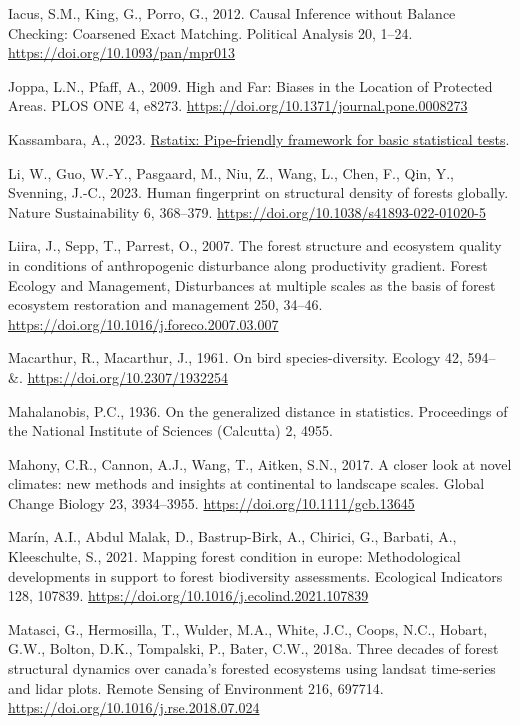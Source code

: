 \documentclass[
]{agujournal2019}
\newlength{\cslhangindent}
\newenvironment{CSLReferences}[2] %
 {\begin{list}{}{%
  \setlength{\itemindent}{0pt}
  \setlength{\leftmargin}{0pt}
  \setlength{\parsep}{0pt}
  \ifodd #1
   \setlength{\leftmargin}{\cslhangindent}
   \setlength{\itemindent}{-1\cslhangindent}
  \fi
  \setlength{\itemsep}{#2\baselineskip}}}
 {\end{list}}
\begin{document}
\begin{CSLReferences}{1}{0}
Iacus, S.M., King, G., Porro, G., 2012. Causal Inference without Balance
Checking: Coarsened Exact Matching. Political Analysis 20, 1--24.
\url{https://doi.org/10.1093/pan/mpr013}

Joppa, L.N., Pfaff, A., 2009. High and Far: Biases in the Location of
Protected Areas. PLOS ONE 4, e8273.
\url{https://doi.org/10.1371/journal.pone.0008273}

Kassambara, A., 2023.
\href{https://rpkgs.datanovia.com/rstatix/}{Rstatix: Pipe-friendly
framework for basic statistical tests}.

Li, W., Guo, W.-Y., Pasgaard, M., Niu, Z., Wang, L., Chen, F., Qin, Y.,
Svenning, J.-C., 2023. Human fingerprint on structural density of
forests globally. Nature Sustainability 6, 368--379.
\url{https://doi.org/10.1038/s41893-022-01020-5}

Liira, J., Sepp, T., Parrest, O., 2007. The forest structure and
ecosystem quality in conditions of anthropogenic disturbance along
productivity gradient. Forest Ecology and Management, Disturbances at
multiple scales as the basis of forest ecosystem restoration and
management 250, 34--46.
\url{https://doi.org/10.1016/j.foreco.2007.03.007}

Macarthur, R., Macarthur, J., 1961. On bird species-diversity. Ecology
42, 594-- \&. \url{https://doi.org/10.2307/1932254}

Mahalanobis, P.C., 1936. On the generalized distance in statistics.
Proceedings of the National Institute of Sciences (Calcutta) 2, 4955.

Mahony, C.R., Cannon, A.J., Wang, T., Aitken, S.N., 2017. A closer look
at novel climates: new methods and insights at continental to landscape
scales. Global Change Biology 23, 3934--3955.
\url{https://doi.org/10.1111/gcb.13645}

Marín, A.I., Abdul Malak, D., Bastrup-Birk, A., Chirici, G., Barbati,
A., Kleeschulte, S., 2021. Mapping forest condition in europe:
Methodological developments in support to forest biodiversity
assessments. Ecological Indicators 128, 107839.
\url{https://doi.org/10.1016/j.ecolind.2021.107839}

Matasci, G., Hermosilla, T., Wulder, M.A., White, J.C., Coops, N.C.,
Hobart, G.W., Bolton, D.K., Tompalski, P., Bater, C.W., 2018a. Three
decades of forest structural dynamics over canada's forested ecosystems
using landsat time-series and lidar plots. Remote Sensing of Environment
216, 697714. \url{https://doi.org/10.1016/j.rse.2018.07.024}


\end{CSLReferences}
\end{document}
